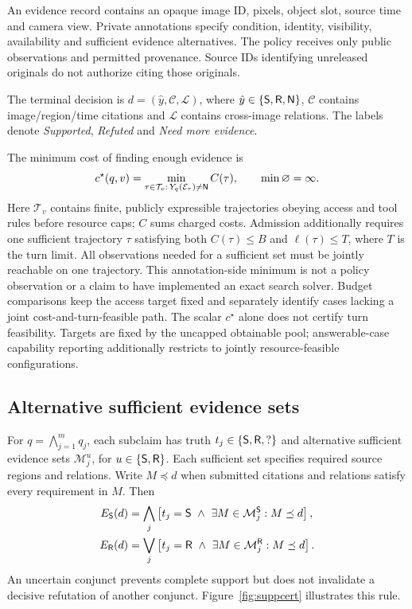 An evidence record contains an opaque image ID, pixels, object slot, source time and camera view.
Private annotations specify condition, identity, visibility, availability and sufficient evidence alternatives.
The policy receives only public observations and permitted provenance.
Source IDs identifying unreleased originals do not authorize citing those originals.

The terminal decision is \(d=(\hat y,\mathcal{C},\mathcal{L})\), where \(\hat y\in\{\mathsf{S},\mathsf{R},\mathsf{N}\}\), \(\mathcal{C}\) contains image/region/time citations and \(\mathcal{L}\) contains cross-image relations.
The labels denote \emph{Supported}, \emph{Refuted} and \emph{Need more evidence}.

The minimum cost of finding enough evidence is
\begin{equation}
c^\star(q,v)=
\min_{\tau\in\mathcal{T}_v:\,Y_q(\mathcal{E}_{\tau})\ne\mathsf{N}}
C(\tau),\qquad \min\varnothing=\infty.
\end{equation}
Here \(\mathcal{T}_v\) contains finite, publicly expressible trajectories obeying access and tool rules before resource caps; \(C\) sums charged costs. Admission additionally requires one sufficient trajectory \(\tau\) satisfying both \(C(\tau)\le B\) and \(\ell(\tau)\le T\), where \(T\) is the turn limit.
All observations needed for a sufficient set must be jointly reachable on one trajectory.
This annotation-side minimum is not a policy observation or a claim to have implemented an exact search solver.
Budget comparisons keep the access target fixed and separately identify cases lacking a joint cost-and-turn-feasible path. The scalar \(c^\star\) alone does not certify turn feasibility. Targets are fixed by the uncapped obtainable pool; answerable-case capability reporting additionally restricts to jointly resource-feasible configurations.

\subsection{Alternative sufficient evidence sets}
For \(q=\bigwedge_{j=1}^{m}q_j\), each subclaim has truth \(t_j\in\{\mathsf{S},\mathsf{R},?\}\) and alternative sufficient evidence sets \(\mathcal{M}_j^u\), for \(u\in\{\mathsf{S},\mathsf{R}\}\).
Each sufficient set specifies required source regions and relations.
Write \(M\preceq d\) when submitted citations and relations satisfy every requirement in \(M\).
Then
\begin{align}
E_{\mathsf{S}}(d)
 &=\bigwedge_j\left[t_j=\mathsf{S}\ \land\
 \exists M\in\mathcal{M}_j^{\mathsf{S}}:M\preceq d\right],\\
E_{\mathsf{R}}(d)
 &=\bigvee_j\left[t_j=\mathsf{R}\ \land\
 \exists M\in\mathcal{M}_j^{\mathsf{R}}:M\preceq d\right].
\end{align}
An uncertain conjunct prevents complete support but does not invalidate a decisive refutation of another conjunct.
Figure~\ref{fig:suppcert} illustrates this rule.

